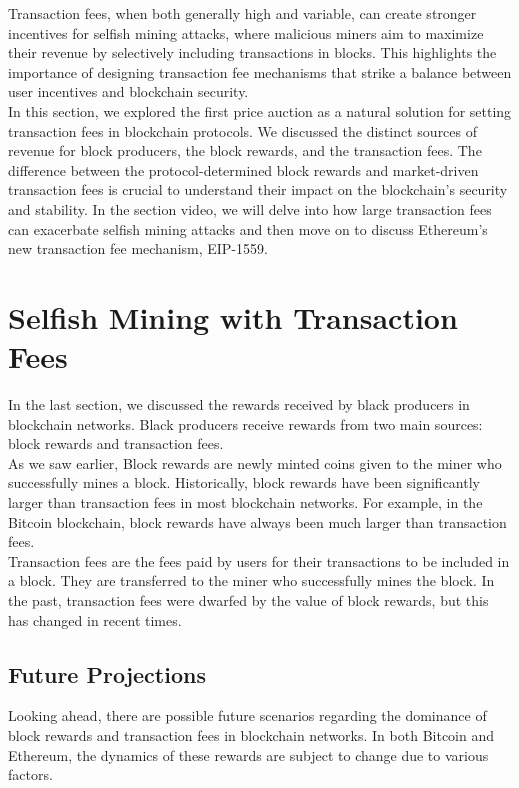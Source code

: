 Transaction fees, when both generally high and variable, can create stronger incentives for selfish mining attacks, where malicious miners aim to maximize their revenue by selectively including transactions in blocks. This highlights the importance of designing transaction fee mechanisms that strike a balance between user incentives and blockchain security.\\

In this section, we explored the first price auction as a natural solution for setting transaction fees in blockchain protocols. We discussed the distinct sources of revenue for block producers, the block rewards, and the transaction fees. The difference between the protocol-determined block rewards and market-driven transaction fees is crucial to understand their impact on the blockchain's security and stability. In the section video, we will delve into how large transaction fees can exacerbate selfish mining attacks and then move on to discuss Ethereum's new transaction fee mechanism, EIP-1559.

\section{Selfish Mining with Transaction Fees}
In the last section, we discussed the rewards received by black producers in blockchain networks. Black producers receive rewards from two main sources: block rewards and transaction fees.\\

As we saw earlier, Block rewards are newly minted coins given to the miner who successfully mines a block. Historically, block rewards have been significantly larger than transaction fees in most blockchain networks. For example, in the Bitcoin blockchain, block rewards have always been much larger than transaction fees.\\

Transaction fees are the fees paid by users for their transactions to be included in a block. They are transferred to the miner who successfully mines the block. In the past, transaction fees were dwarfed by the value of block rewards, but this has changed in recent times.

\subsection{Future Projections}
Looking ahead, there are possible future scenarios regarding the dominance of block rewards and transaction fees in blockchain networks. In both Bitcoin and Ethereum, the dynamics of these rewards are subject to change due to various factors.


